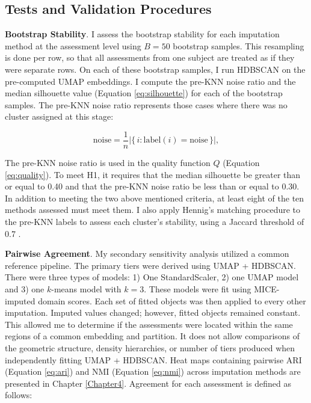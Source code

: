 \subsection{Tests and Validation Procedures}
\textbf{Bootstrap Stability}. I assess the bootstrap stability for each imputation method at the assessment level using \(B = 50\) bootstrap samples. This resampling is done per row, so that all assessments from one subject are treated as if they were separate rows. On each of these bootstrap samples, I run HDBSCAN on the pre-computed UMAP embeddings. I compute the pre-KNN noise ratio and the median silhouette value (Equation \ref{eq:silhouette}) for each of the bootstrap samples. The pre-KNN noise ratio represents those cases where there was no cluster assigned at this stage:

\begin{equation}\label{eq:noise}
\text{noise}=\frac{1}{n}\bigl|\{\,i:\text{label}(i)=\text{noise}\,\}\bigr|,
\end{equation}

The pre-KNN noise ratio is used in the quality function \(Q\) (Equation \ref{eq:quality}). To meet H1, it requires that the median silhouette be greater than or equal to 0.40 and that the pre-KNN noise ratio be less than or equal to 0.30. In addition to meeting the two above mentioned criteria, at least eight of the ten methods assessed must meet them. I also apply Hennig's matching procedure to the pre-KNN labels to assess each cluster's stability, using a Jaccard threshold of 0.7 \parencite{hennig2007cluster}.

\textbf{Pairwise Agreement}. My secondary sensitivity analysis utilized a common reference pipeline. The primary tiers were derived using UMAP + HDBSCAN. There were three types of models: 1) One StandardScaler, 2) one UMAP model and 3) one \(k\)-means model with \(k=3\). These models were fit using MICE-imputed domain scores. Each set of fitted objects was then applied to every other imputation. Imputed values changed; however, fitted objects remained constant. This allowed me to determine if the assessments were located within the same regions of a common embedding and partition. It does not allow comparisons of the geometric structure, density hierarchies, or number of tiers produced when independently fitting UMAP + HDBSCAN. Heat maps containing pairwise ARI (Equation \ref{eq:ari}) and NMI (Equation \ref{eq:nmi}) across imputation methods are presented in Chapter \ref{Chapter4}. Agreement for each assessment is defined as follows:

